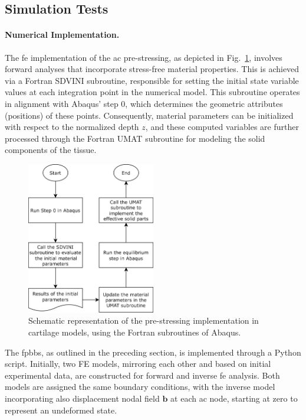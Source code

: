 \documentclass[12pt,a4paper]{report}
\begin{document}
\subsection{Simulation Tests}\label{section:simulation_fe}

\paragraph{Numerical Implementation.} The \ac{fe} implementation of the \ac{ac} pre-stressing, as depicted in Fig.~\ref{fig:psa_subroutines}, involves forward analyses that incorporate stress-free material properties. This is achieved via a Fortran SDVINI subroutine, responsible for setting the initial state variable values at each integration point in the numerical model. This subroutine operates in alignment with Abaqus' step 0, which determines the geometric attributes (positions) of these points. Consequently, material parameters can be initialized with respect to the normalized depth $z$, and these computed variables are further processed through the Fortran UMAT subroutine for modeling the solid components of the tissue.

\begin{figure}[t]\centering
\includegraphics[width=0.5\textwidth]{img/psa_subroutines.png}
\caption{Schematic representation of the pre-stressing implementation in cartilage models, using the Fortran subroutines of Abaqus.}
\label{fig:psa_subroutines}
\end{figure}

The \ac{fpbbs}, as outlined in the preceding section, is implemented through a Python script. Initially, two FE models, mirroring each other and based on initial experimental data, are constructed for forward and inverse \ac{fe} analysis. Both models are assigned the same boundary conditions, with the inverse model incorporating also displacement nodal field $\mathbf{b}$ at each \ac{ac} node, starting at zero to represent an undeformed state.
\end{document}
